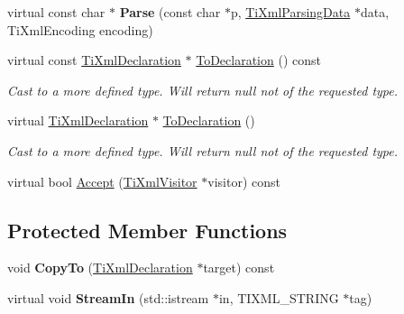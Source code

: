 \begin{DoxyCompactItemize}
\hypertarget{class_ti_xml_declaration_a9839ea97ed687a2b7342fd7b0f04361b}{}\label{class_ti_xml_declaration_a9839ea97ed687a2b7342fd7b0f04361b} 
virtual const char $\ast$ {\bfseries Parse} (const char $\ast$p, \hyperlink{class_ti_xml_parsing_data}{Ti\+Xml\+Parsing\+Data} $\ast$data, Ti\+Xml\+Encoding encoding)
\item 
\hypertarget{class_ti_xml_declaration_aab62703b620d9b9391b482dc1835ecf6}{}\label{class_ti_xml_declaration_aab62703b620d9b9391b482dc1835ecf6} 
virtual const \hyperlink{class_ti_xml_declaration}{Ti\+Xml\+Declaration} $\ast$ \hyperlink{class_ti_xml_declaration_aab62703b620d9b9391b482dc1835ecf6}{To\+Declaration} () const
\begin{DoxyCompactList}\small\item\em Cast to a more defined type. Will return null not of the requested type. \end{DoxyCompactList}\item 
\hypertarget{class_ti_xml_declaration_a6bd3d1daddcaeb9543c24bfd090969ce}{}\label{class_ti_xml_declaration_a6bd3d1daddcaeb9543c24bfd090969ce} 
virtual \hyperlink{class_ti_xml_declaration}{Ti\+Xml\+Declaration} $\ast$ \hyperlink{class_ti_xml_declaration_a6bd3d1daddcaeb9543c24bfd090969ce}{To\+Declaration} ()
\begin{DoxyCompactList}\small\item\em Cast to a more defined type. Will return null not of the requested type. \end{DoxyCompactList}\item 
virtual bool \hyperlink{class_ti_xml_declaration_aa1b6bade6c989407ce9881bdfc73c1e6}{Accept} (\hyperlink{class_ti_xml_visitor}{Ti\+Xml\+Visitor} $\ast$visitor) const
\end{DoxyCompactItemize}
\subsection*{Protected Member Functions}
\begin{DoxyCompactItemize}
\item 
\hypertarget{class_ti_xml_declaration_a189de17b3e04d4e5b1c385336f214af1}{}\label{class_ti_xml_declaration_a189de17b3e04d4e5b1c385336f214af1} 
void {\bfseries Copy\+To} (\hyperlink{class_ti_xml_declaration}{Ti\+Xml\+Declaration} $\ast$target) const
\item 
\hypertarget{class_ti_xml_declaration_af90df1c54c89b0f8dd56168419967610}{}\label{class_ti_xml_declaration_af90df1c54c89b0f8dd56168419967610} 
virtual void {\bfseries Stream\+In} (std\+::istream $\ast$in, T\+I\+X\+M\+L\+\_\+\+S\+T\+R\+I\+NG $\ast$tag)
\end{DoxyCompactItemize}
